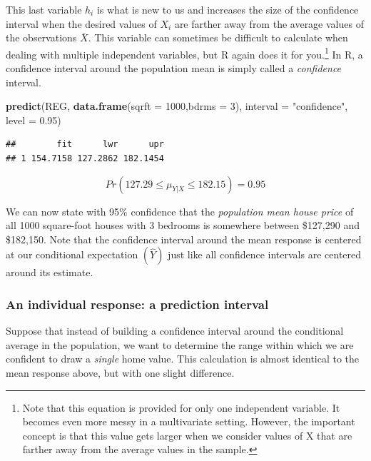 \documentclass[
]{book}
\newenvironment{Shaded}{\begin{snugshade}}{\end{snugshade}}
\newcommand{\AttributeTok}[1]{\textcolor[rgb]{0.13,0.29,0.53}{#1}}
\newcommand{\DecValTok}[1]{\textcolor[rgb]{0.00,0.00,0.81}{#1}}
\newcommand{\FloatTok}[1]{\textcolor[rgb]{0.00,0.00,0.81}{#1}}
\newcommand{\FunctionTok}[1]{\textcolor[rgb]{0.13,0.29,0.53}{\textbf{#1}}}
\newcommand{\NormalTok}[1]{#1}
\newcommand{\StringTok}[1]{\textcolor[rgb]{0.31,0.60,0.02}{#1}}
\begin{document}
This last variable \(h_i\) is what is new to us and increases the size of the confidence interval when the desired values of \(X_i\) are farther away from the average values of the observations \(\bar{X}\). This variable can sometimes be difficult to calculate when dealing with multiple independent variables, but R again does it for you.\footnote{Note that this equation is provided for only one independent variable. It becomes even more messy in a multivariate setting. However, the important concept is that this value gets larger when we consider values of X that are farther away from the average values in the sample.} In R, a confidence interval around the population mean is simply called a \emph{confidence} interval.

\begin{Shaded}
\begin{Highlighting}[]
\FunctionTok{predict}\NormalTok{(REG,}
        \FunctionTok{data.frame}\NormalTok{(}\AttributeTok{sqrft =} \DecValTok{1000}\NormalTok{,}\AttributeTok{bdrms =} \DecValTok{3}\NormalTok{), }
        \AttributeTok{interval =} \StringTok{"confidence"}\NormalTok{,}
        \AttributeTok{level =} \FloatTok{0.95}\NormalTok{)}
\end{Highlighting}
\end{Shaded}

\begin{verbatim}
##        fit      lwr      upr
## 1 154.7158 127.2862 182.1454
\end{verbatim}

\[Pr(127.29\leq\mu_{Y|X}\leq182.15)=0.95\]

We can now state with 95\% confidence that the \emph{population mean house price} of all 1000 square-foot houses with 3 bedrooms is somewhere between \$127,290 and \$182,150. Note that the confidence interval around the mean response is centered at our conditional expectation \((\hat{Y})\) just like all confidence intervals are centered around its estimate.

\subsubsection*{An individual response: a prediction interval}\label{an-individual-response-a-prediction-interval-1}

Suppose that instead of building a confidence interval around the conditional average in the population, we want to determine the range within which we are confident to draw a \emph{single} home value. This calculation is almost identical to the mean response above, but with one slight difference.
\end{document}
